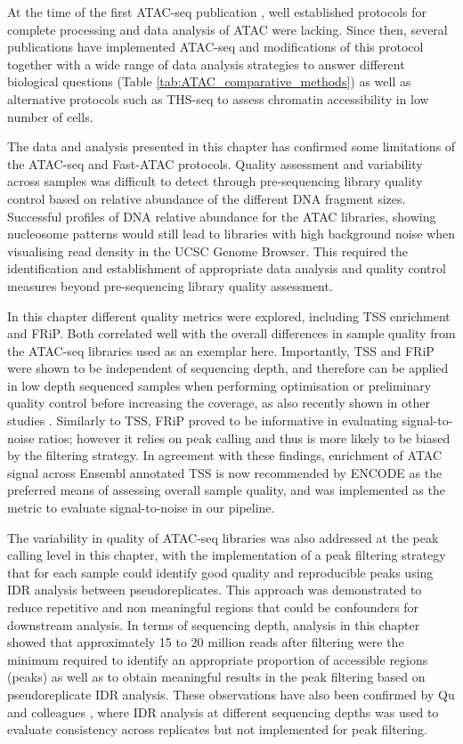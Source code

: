 At the time of the first ATAC-seq publication \parencite{Buenrostro2013}, well established protocols for complete processing and data analysis of ATAC were lacking. Since then, several publications have implemented ATAC-seq and modifications of this protocol together with a wide range of data analysis strategies to answer different biological questions (Table \ref{tab:ATAC_comparative_methods}) as well as alternative protocols such as THS-seq to assess chromatin accessibility in low number of cells.

The data and analysis presented in this chapter has confirmed some limitations of the ATAC-seq and Fast-ATAC protocols. Quality assessment and variability across samples was difficult to detect through pre-sequencing library quality control based on relative abundance of the different DNA fragment sizes. Successful profiles of DNA relative abundance for the ATAC libraries, showing nucleosome patterns would still lead to libraries with high background noise when visualising read density in the UCSC Genome Browser. This required the identification and establishment of appropriate data analysis and quality control measures beyond pre-sequencing library quality assessment.

In this chapter different quality metrics were explored, including TSS enrichment and FRiP. Both correlated well with the overall differences in sample quality from the ATAC-seq libraries used as an exemplar here. Importantly, TSS and FRiP were shown to be independent of sequencing depth, and therefore can be applied in low depth sequenced samples when performing optimisation or preliminary quality control before increasing the coverage, as also recently shown in other studies \parencite{Corces2017}. Similarly to TSS, FRiP proved to be informative in evaluating signal-to-noise ratios; however it relies on peak calling and thus is more likely to be biased by the filtering strategy. In agreement with these findings, enrichment of ATAC signal across Ensembl annotated TSS is now recommended by ENCODE as the preferred means of assessing overall sample quality, and was implemented as the metric to evaluate signal-to-noise in our pipeline. 

The variability in quality of ATAC-seq libraries was also addressed at the peak calling level in this chapter, with the implementation of a peak filtering strategy that for each sample could identify good quality and reproducible peaks using IDR analysis between pseudoreplicates. This approach was demonstrated to reduce  repetitive and non meaningful regions that could be confounders for downstream analysis. In terms of sequencing depth, analysis in this chapter showed that approximately 15 to 20 million reads after filtering were the minimum required to identify an appropriate proportion of accessible regions (peaks) as well as to obtain meaningful results in the peak filtering based on pseudoreplicate IDR analysis. These observations have also been confirmed by Qu and colleagues \parencite{Qu2017}, where IDR analysis at different sequencing depths was used to evaluate consistency across replicates but not implemented for peak filtering.

